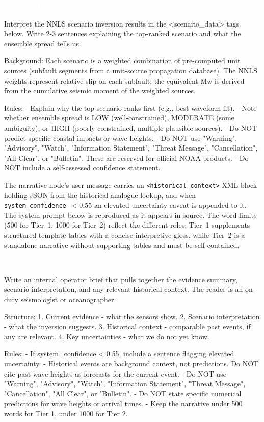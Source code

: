 \documentclass{article}
\newcommand{\promptlabel}[2][black!70]{%
  \begin{tcolorbox}[
    enhanced,
    arc=2.5pt,
    boxrule=0pt,
    colback=#1, colframe=#1,
    rounded corners=northwest, rounded corners=northeast,
    sharp corners=south,
    left=8pt, right=8pt, top=3pt, bottom=3pt,
    after skip=-0.6pt, before skip=10pt,
  ]
  \sffamily\small\bfseries\textcolor{white}{#2}
  \end{tcolorbox}%
}
\begin{document}
\promptlabel[promptfast]{Scenario Interpretation Prompt \normalfont\textnormal{\textit{(fast model)}}}
\begin{promptbox}
Interpret the NNLS scenario inversion results in the <scenario_data> tags
below. Write 2-3 sentences explaining the top-ranked scenario and what the
ensemble spread tells us.

Background: Each scenario is a weighted combination of pre-computed unit
sources (subfault segments from a unit-source propagation database). The NNLS
weights represent relative slip on each subfault; the equivalent Mw is
derived from the cumulative seismic moment of the weighted sources.

Rules:
- Explain why the top scenario ranks first (e.g., best waveform fit).
- Note whether ensemble spread is LOW (well-constrained), MODERATE
  (some ambiguity), or HIGH (poorly constrained, multiple plausible sources).
- Do NOT predict specific coastal impacts or wave heights.
- Do NOT use "Warning", "Advisory", "Watch", "Information Statement",
  "Threat Message", "Cancellation", "All Clear", or "Bulletin". These are
  reserved for official NOAA products.
- Do NOT include a self-assessed confidence statement.
\end{promptbox}

The narrative node's user message carries an
\texttt{<historical\_context>} XML block holding JSON from the
historical analogue lookup, and when
\texttt{system\_confidence}~$< 0.55$ an elevated uncertainty caveat is
appended to it.  The system prompt below is reproduced as it appears
in source.
The word limits (500 for Tier~1, 1000 for Tier~2) reflect the
different roles: Tier~1 supplements structured template tables with a
concise interpretive gloss, while Tier~2 is a standalone narrative
without supporting tables and must be self-contained.

\promptlabel[promptstandard]{Narrative Synthesis Prompt \normalfont\textnormal{\textit{(standard model)}}}
\begin{promptbox}
Write an internal operator brief that pulls together the evidence summary,
scenario interpretation, and any relevant historical context. The reader is
an on-duty seismologist or oceanographer.

Structure:
1. Current evidence - what the sensors show.
2. Scenario interpretation - what the inversion suggests.
3. Historical context - comparable past events, if any are relevant.
4. Key uncertainties - what we do not yet know.

Rules:
- If system_confidence < 0.55, include a sentence flagging elevated uncertainty.
- Historical events are background context, not predictions. Do NOT cite
  past wave heights as forecasts for the current event.
- Do NOT use "Warning", "Advisory", "Watch", "Information Statement",
  "Threat Message", "Cancellation", "All Clear", or "Bulletin".
- Do NOT state specific numerical predictions for wave heights or arrival times.
- Keep the narrative under 500 words for Tier 1, under 1000 for Tier 2.
\end{promptbox}
\end{document}
